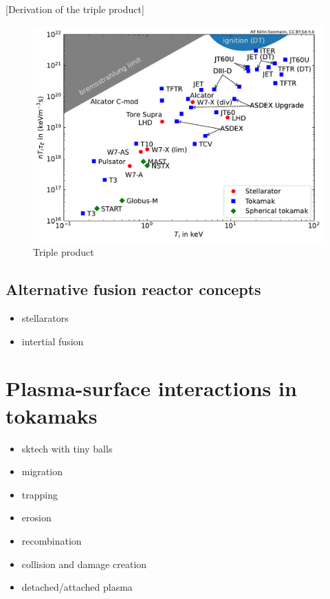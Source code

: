[Derivation of the triple product]


\begin{figure}
    \centering
    \includegraphics[width=\linewidth]{Figures/Chapter1/triple_product_vs_T.pdf}
    \caption{Triple product}
\end{figure}

\subsection{Alternative fusion reactor concepts}
\begin{itemize}
    \item stellarators
    \item intertial fusion
\end{itemize}

\section{Plasma-surface interactions in tokamaks}

\begin{itemize}
    \item sktech with tiny balls
    \item migration
    \item trapping
    \item erosion
    \item recombination
    \item collision and damage creation
    \item detached/attached plasma
\end{itemize}


